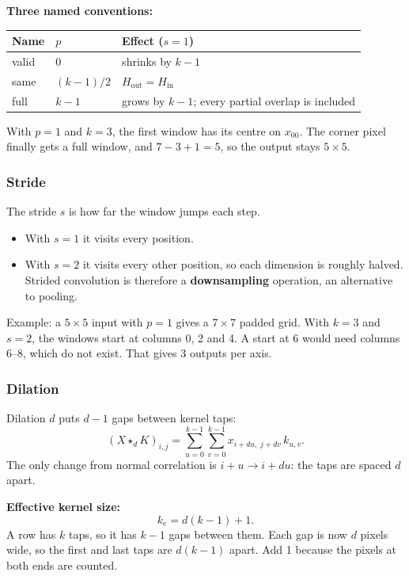 \textbf{Three named conventions:}

\begin{center}
\begin{tabular}{lll}
\toprule
Name & $p$ & Effect ($s=1$)\\
\midrule
valid & $0$ & shrinks by $k-1$\\
same & $(k-1)/2$ & $H_{\text{out}}=H_{\text{in}}$\\
full & $k-1$ & grows by $k-1$; every partial overlap is included\\
\bottomrule
\end{tabular}
\end{center}

With $p=1$ and $k=3$, the first window has its centre on $x_{00}$. The corner pixel finally gets a full window, and $7-3+1=5$, so the output stays $5\times5$.

\subsubsection*{Stride}

The stride $s$ is how far the window jumps each step.
\begin{itemize}
  \item With $s=1$ it visits every position.
  \item With $s=2$ it visits every other position, so each dimension is roughly halved. Strided convolution is therefore a \textbf{downsampling} operation, an alternative to pooling.
\end{itemize}

Example: a $5\times5$ input with $p=1$ gives a $7\times7$ padded grid. With $k=3$ and $s=2$, the windows start at columns 0, 2 and 4. A start at 6 would need columns 6--8, which do not exist. That gives 3 outputs per axis.

\subsubsection*{Dilation}

Dilation $d$ puts $d-1$ gaps between kernel taps:
\[
(X\star_d K)_{i,j}=\sum_{u=0}^{k-1}\sum_{v=0}^{k-1} x_{i+du,\;j+dv}\,k_{u,v}.
\]
The only change from normal correlation is $i+u\to i+du$: the taps are spaced $d$ apart.

\textbf{Effective kernel size:}
\[
k_e=d(k-1)+1.
\]
A row has $k$ taps, so it has $k-1$ gaps between them. Each gap is now $d$ pixels wide, so the first and last taps are $d(k-1)$ apart. Add 1 because the pixels at both ends are counted.

